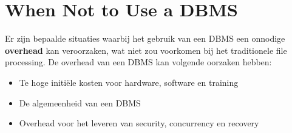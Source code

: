 \setcounter{section}{7}
\section{When Not to Use a DBMS}
Er zijn bepaalde situaties waarbij het gebruik van een DBMS een onnodige \textbf{overhead} kan veroorzaken, wat niet zou voorkomen bij het traditionele file processing. De overhead van een DBMS kan volgende oorzaken hebben:
\begin{itemize}
\item Te hoge initi\"ele kosten voor hardware, software en training
\item De algemeenheid van een DBMS
\item Overhead voor het leveren van security, concurrency en recovery
\end{itemize}